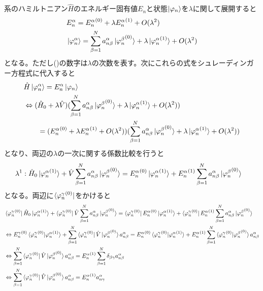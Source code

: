 \documentclass{jsarticle}  %
\numberwithin{equation}{section} %
\numberwithin{figure}{section}
\begin{document}
    系のハミルトニアン$\hat{H}$のエネルギー固有値$E_n$と状態$\ket{\varphi_n}$を$\lambda$に関して展開すると
    \begin{align}
        &E_n^\alpha = {E_n^\alpha}^{(0)} + \lambda {E_n^\alpha}^{(1)} + O(\lambda^2) \\
            &\ket{{\varphi_n^\alpha}} = \sum_{\beta=1}^{N} a_{n \beta}^\alpha \ket{{\varphi_n^\beta}^{(0)}} + \lambda \ket{{\varphi_n^\alpha}^{(1)}} + O(\lambda^2)
    \end{align}
    となる。ただし()の数字は$\lambda$の次数を表す。次にこれらの式をシュレーディンガー方程式に代入すると
    \begin{align}
        &\hat{H} \ket{\varphi_n^\alpha} = E_n^\alpha\ket{\varphi_n} \notag \\
        &\Leftrightarrow (\hat{H}_0 + \lambda\hat{V}) (\sum_{\beta=1}^{N} a_{n \beta}^\alpha \ket{{\varphi_n^\beta}^{(0)}} + \lambda \ket{{\varphi_n^\alpha}^{(1)}} + O(\lambda^2)) \\
        &\ \ \ \ \ \ = ({E_n^\alpha}^{(0)} + \lambda {E_n^\alpha}^{(1)} + O(\lambda^2))(\sum_{\beta=1}^{N} a_{n \beta}^\alpha \ket{{\varphi_n^\beta}^{(0)}} + \lambda \ket{{\varphi_n^\alpha}^{(1)}} + O(\lambda^2))
    \end{align}
    となり、両辺の$\lambda$の一次に関する係数比較を行うと
    \begin{align}
        &\lambda^1:\hat{H}_0 \ket{{\varphi_n^\alpha}^{(1)}} + \hat{V}\sum_{\beta=1}^{N}a_{n \beta}^\alpha\ket{{\varphi_n^\beta}^{(0)}} = {E_n^\alpha}^{(0)}\ket{{\varphi_n^\alpha}^{(1)}} + {E_n^\alpha}^{(1)}\sum_{\beta=1}^{N}a_{n \beta}^\alpha\ket{{\varphi_n^\beta}^{(0)}}
    \end{align}
    となる。両辺に$\bra{{\varphi_n^\gamma}^{(0)}}$をかけると
    \begin{align}
        &\bra{{\varphi_n^\gamma}^{(0)}}\hat{H}_0 \ket{{\varphi_n^\alpha}^{(1)}} + \bra{{\varphi_n^\gamma}^{(0)}}\hat{V}\sum_{\beta=1}^{N}a_{n \beta}^\alpha\ket{{\varphi_n^\beta}^{(0)}} = \bra{{\varphi_n^\gamma}^{(0)}}{E_n^\alpha}^{(0)}\ket{{\varphi_n^\alpha}^{(1)}} + \bra{{\varphi_n^\gamma}^{(0)}}{E_n^\alpha}^{(1)}\sum_{\beta=1}^{N}a_{n \beta}^\alpha\ket{{\varphi_n^\beta}^{(0)}} \notag \\
        &\Leftrightarrow {E_n^\gamma}^{(0)}\braket{{\varphi_n^\gamma}^{(0)}|{\varphi_n^\alpha}^{(1)}} + \sum_{\beta=1}^{N}\bra{{\varphi_n^\gamma}^{(0)}}\hat{V}\ket{{\varphi_n^\beta}^{(0)}}a_{n \beta}^\alpha = {E_n^\alpha}^{(0)}\braket{{\varphi_n^\gamma}^{(0)}|{\varphi_n^\alpha}^{(1)}} + {E_n^\alpha}^{(1)}\sum_{\beta=1}^{N}\braket{{\varphi_n^\gamma}^{(0)}|{\varphi_n^\beta}^{(0)}}a_{n \beta}^\alpha \notag \\
        &\Leftrightarrow  \sum_{\beta=1}^{N}\bra{{\varphi_n^\gamma}^{(0)}}\hat{V}\ket{{\varphi_n^\beta}^{(0)}}a_{n \beta}^\alpha =  {E_n^\alpha}^{(1)}\sum_{\beta=1}^{N}\delta_{\beta \gamma}a_{n \beta}^\alpha \notag \\
        &\Leftrightarrow  \sum_{\beta=1}^{N}\bra{{\varphi_n^\gamma}^{(0)}}\hat{V}\ket{{\varphi_n^\beta}^{(0)}}a_{n \beta}^\alpha =  {E_n^\alpha}^{(1)}a_{n \gamma}^\alpha
    \end{align}
\end{document}
